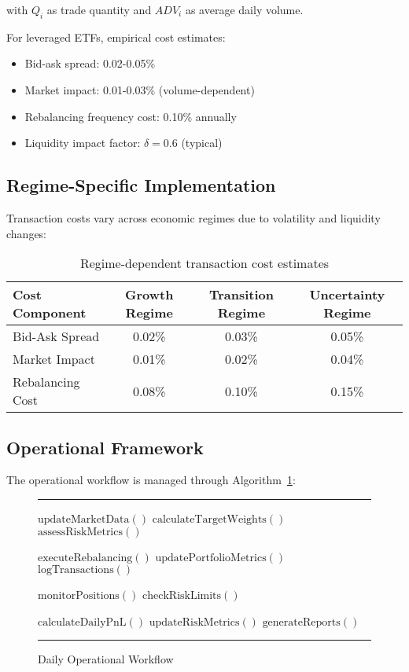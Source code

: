 \documentclass[onecolumn,11pt]{IEEEtran}
\renewenvironment{algorithm}[1][h]
  {\begin{figure}[#1]
   \centering
   \begin{minipage}{0.9\textwidth}
   \hrule
   \vspace{0.3em}}
  {\vspace{0.3em}
   \hrule
   \end{minipage}
   \end{figure}}
\begin{document}
with $Q_i$ as trade quantity and $ADV_i$ as average daily volume.

For leveraged ETFs, empirical cost estimates:
\begin{itemize}
    \item Bid-ask spread: 0.02-0.05\%
    \item Market impact: 0.01-0.03\% (volume-dependent)
    \item Rebalancing frequency cost: 0.10\% annually
    \item Liquidity impact factor: $\delta = 0.6$ (typical)
\end{itemize}

\subsection{Regime-Specific Implementation}

Transaction costs vary across economic regimes due to volatility and liquidity changes:

\begin{table}[h]
\centering
\begin{tabular}{lccc}
\toprule
\textbf{Cost Component} & \textbf{Growth Regime} & \textbf{Transition Regime} & \textbf{Uncertainty Regime} \\
\midrule
Bid-Ask Spread & 0.02\% & 0.03\% & 0.05\% \\
Market Impact & 0.01\% & 0.02\% & 0.04\% \\
Rebalancing Cost & 0.08\% & 0.10\% & 0.15\% \\
\bottomrule
\end{tabular}
\caption{Regime-dependent transaction cost estimates}
\end{table}

\subsection{Operational Framework}

The operational workflow is managed through Algorithm~\ref{alg:operational}:

\begin{algorithm}
\caption{Daily Operational Workflow}
\label{alg:operational}
\begin{algorithmic}[1]
    \State $\text{updateMarketData}()$ 
    \State $\text{calculateTargetWeights}()$
    \State $\text{assessRiskMetrics}()$
    
     
        \State $\text{executeRebalancing}()$
        \State $\text{updatePortfolioMetrics}()$
        \State $\text{logTransactions}()$
    \EndIf
    
    \State $\text{monitorPositions}()$ 
    \State $\text{checkRiskLimits}()$
    
    \State $\text{calculateDailyPnL}()$ 
    \State $\text{updateRiskMetrics}()$
    \State $\text{generateReports}()$
\EndFunction
\end{algorithmic}
\end{algorithm}
\end{document}
